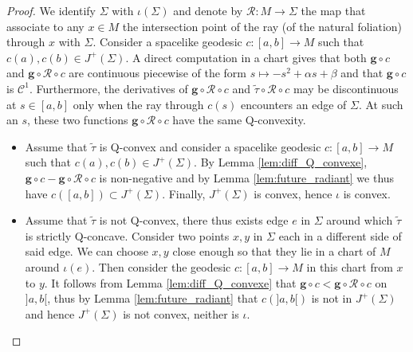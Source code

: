 \documentclass[a4paper,12pt]{article}
\def\R{\mathbb{R}}
\def\R{\mathcal R}
\def\quadform{\mathbf{g}}
\theoremstyle{definition}
\begin{document}
					\begin{proof} We identify $\Sigma$ with $\iota(\Sigma)$ and
					denote by $\R: M \rightarrow \Sigma$ the map that associate to any $x\in M$ the intersection point of the ray (of the natural foliation) through $x$ with $\Sigma$. 
					Consider a spacelike geodesic $c:[a,b]\rightarrow M$ such that $c(a),c(b) \in J^+(\Sigma)$. A direct computation in a chart gives that both $ \quadform\circ c$ and $ \quadform\circ \R\circ c$ are continuous piecewise of the form $s \mapsto -s^2+\alpha s+\beta$ and that $\quadform\circ c$ is $\mathscr C^1$. Furthermore, the derivatives of $ \quadform\circ \R\circ c$ and $\widetilde\tau\circ \R\circ c$ may be discontinuous at $s\in [a,b]$ only when the ray through $c(s)$ encounters an edge of $\Sigma$.
						At such an $s$, these two functions $\quadform\circ \R\circ c$ have the same Q-convexity.
					
					\begin{itemize}
						\item Assume that $\widetilde\tau$ is Q-convex and consider a spacelike geodesic $c:[a,b]\rightarrow M$ such that $c(a),c(b) \in J^+(\Sigma)$. By Lemma \ref{lem:diff_Q_convexe}, $\quadform\circ c- \quadform\circ \R\circ c$ is non-negative and by Lemma \ref{lem:future_radiant} we thus have $c([a,b])\subset J^+(\Sigma)$. Finally, $J^+(\Sigma)$ is convex, hence $\iota$ is convex.
						\item Assume that $\widetilde\tau$ is not Q-convex, there thus exists edge $e$ in $\Sigma$ around which $\widetilde\tau$ is strictly Q-concave. Consider two points $x,y$ in $\Sigma$ each in a different side of said edge. We can choose $x,y$ close enough so that they lie in a chart of $M$ around $\iota(e)$. Then consider the geodesic $c:[a,b]\rightarrow M$ in this chart from $x$ to $y$. It follows from Lemma \ref{lem:diff_Q_convexe} that
						$\quadform\circ c<\quadform\circ \R\circ c$ on $]a,b[$, thus by Lemma \ref{lem:future_radiant} that $c(]a,b[)$ is not in $J^+(\Sigma)$ and hence $J^+(\Sigma)$ is not convex, neither is $\iota$.
						
						
					\end{itemize}\end{proof}
		
\end{document}
